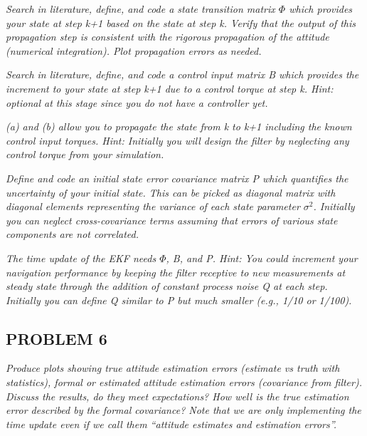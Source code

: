 \textit{Search in literature, define, and code a state transition matrix $\Phi$ which provides your state at step k+1 based on the state at step k. Verify that the output of this propagation step is consistent with the rigorous propagation of the attitude (numerical integration). Plot propagation errors as needed.}

\textit{Search in literature, define, and code a control input matrix B which provides the increment to your state at step k+1 due to a control torque at step k. Hint: optional at this stage since you do not have a controller yet.}

\textit{(a) and (b) allow you to propagate the state from k to k+1 including the known control input torques. Hint: Initially you will design the filter by neglecting any control torque from your simulation.}

\textit{Define and code an initial state error covariance matrix P which quantifies the uncertainty of your initial state. This can be picked as diagonal matrix with diagonal elements representing the variance of each state parameter $\sigma^{2}$. Initially you can neglect cross-covariance terms assuming that errors of various state components are not correlated.}

\textit{The time update of the EKF needs $\Phi$, B, and P. Hint: You could increment your navigation performance by keeping the filter receptive to new measurements at steady state through the addition of constant process noise Q at each step. Initially you can define Q similar to P but much smaller (e.g., 1/10 or 1/100).}

\subsection{PROBLEM 6}
\textit{Produce plots showing true attitude estimation errors (estimate vs truth with statistics), formal or estimated attitude estimation errors (covariance from filter). Discuss the results, do they meet expectations? How well is the true estimation error described by the formal covariance? Note that we are only implementing the time update even if we call them “attitude estimates and estimation errors”.}